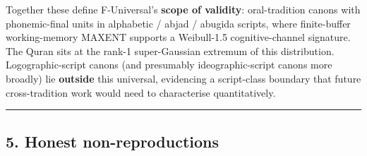\documentclass[
]{article}
\begin{document}
Together these define F-Universal's \textbf{scope of validity}:
oral-tradition canons with phonemic-final units in alphabetic / abjad /
abugida scripts, where finite-buffer working-memory MAXENT supports a
Weibull-1.5 cognitive-channel signature. The Quran sits at the rank-1
super-Gaussian extremum of this distribution. Logographic-script canons
(and presumably ideographic-script canons more broadly) lie
\textbf{outside} this universal, evidencing a script-class boundary that
future cross-tradition work would need to characterise quantitatively.

\begin{center}\rule{0.5\linewidth}{0.5pt}\end{center}

\subsection{5. Honest non-reproductions}\label{honest-non-reproductions}
\end{document}

